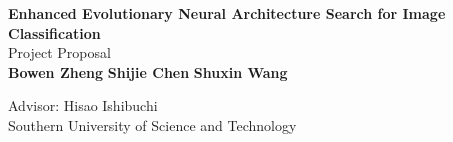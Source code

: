 \documentclass{article}
\begin{document}
 \begin{center}
   
   
   \LARGE{\textbf{Enhanced Evolutionary Neural Architecture Search for Image Classification}} \\
       \vspace{1em}
       \Large{Project Proposal} \\
       \vspace{1em}
       \normalsize\textbf{ Bowen Zheng   }  
       \normalsize\textbf{ Shijie Chen   } 
       \normalsize\textbf{ Shuxin Wang  } 
       
       \vspace{1em}
       \normalsize{Advisor: Hisao Ishibuchi} \\
       \vspace{1em}
       \normalsize{Southern University of Science and Technology} 
 \end{center}
\end{document}
